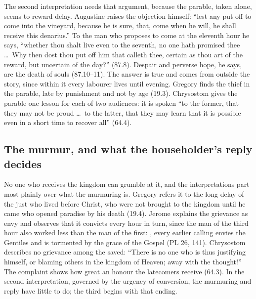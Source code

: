 The second interpretation needs that argument, because the parable, taken
alone, seems to reward delay. Augustine raises the objection himself: ``lest
any put off to come into the vineyard, because he is sure, that, come when he
will, he shall receive this denarius.'' To the man who proposes to come at the
eleventh hour he says,
``whether thou shalt live even to the seventh, no one hath promised thee
\ldots\ Why then dost thou put off him that calleth thee, certain as thou art
of the reward, but uncertain of the day?'' (87.8). Despair and perverse hope,
he says, are the death of souls (87.10--11). The answer is true and comes from
outside the story, since within it every labourer lives until evening. Gregory
finds the thief in the parable, late by punishment and not by age (19.3).
Chrysostom gives the parable one lesson for
each of two audiences: it is spoken ``to the former, that they may not be
proud \ldots\ to the latter, that they may learn that it is possible even in a
short time to recover all'' (64.4).

\subsection{The murmur, and what the householder's reply decides}

No one who receives the kingdom can grumble at it, and the interpretations
part most plainly over what the murmuring is. Gregory refers it to the long
delay of the just who lived before Christ, who were not brought to the kingdom
until he came who opened paradise by his death (19.4). Jerome explains the grievance as envy and observes that
it convicts every hour in turn, since the man of the third hour also worked
less than the man of the first: , every earlier calling envies the
Gentiles and is tormented by the grace of the Gospel (PL 26, 141). Chrysostom describes no grievance among the saved: ``There is no one who is
thus justifying himself, or blaming others in the kingdom of Heaven; away
with the thought!'' The complaint shows how great an honour the latecomers
receive (64.3). In the second interpretation, governed by the urgency of
conversion, the murmuring and reply have little to do; the third begins with
that ending.

